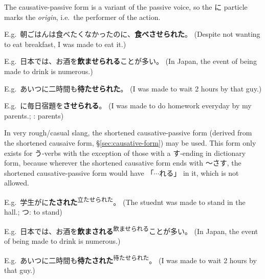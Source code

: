 \documentclass[../nihongo-gakushuu-kyouzai.tex]{subfiles}
\begin{document}
The causative-passive form is a variant of the passive voice, so the に particle marks the \emph{origin}, i.e.\ the performer of the action.


E.g.\ 朝ごはんは食べたくなかったのに、\textbf{食べさせられた}。 (Despite not wanting to eat breakfast, I was made to eat it.)

E.g.\ 日本では、お酒を\textbf{飲ませられる}ことが多い。 (In Japan, the event of being made to drink is numerous.)

E.g.\ あいつに二時間も\textbf{待たせられた}。 (I was made to wait 2 hours by that guy.)

E.g.\ に毎日宿題を\textbf{させられる}。 (I was made to do homework everyday by my parents.; : parents)


In very rough/casual slang, the shortened causative-passive form (derived from the shortened causaive form, \S\ref{sec:causative-form}) may be used. This form only exists for う-verbs with the exception of those with a す-ending in dictionary form, because wherever the shortened causative form ends with 〜さす, the shortened causative-passive form would have 「$\cdots$れる」 in it, which is not allowed.

E.g.\ 学生がに\textbf{たされた}\textsuperscript{立たせられた}。 (The stuednt was made to stand in the hall.; つ: to stand)

E.g.\ 日本では、お酒を\textbf{飲まされる}\textsuperscript{飲ませられる}ことが多い。 (In Japan, the event of being made to drink is numerous.)

E.g.\ あいつに二時間も\textbf{待たされた}\textsuperscript{待たせられた}。 (I was made to wait 2 hours by that guy.)
\end{document}
